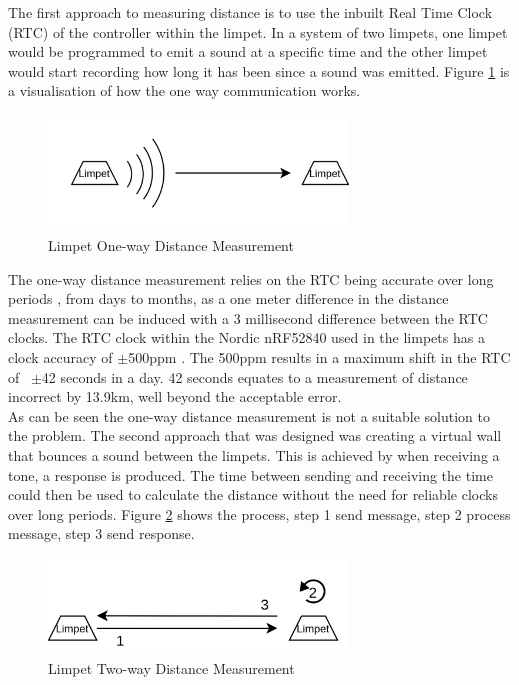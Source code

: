 The first approach to measuring distance is to use the inbuilt Real Time Clock (RTC) of the controller within the limpet. In a system of two limpets, one limpet would be programmed to emit a sound at a specific time and the other limpet would start recording how long it has been since a sound was emitted. Figure \ref{fig:limpetOneway} is a visualisation of how the one way communication works.\\

\begin{figure}[H]
	\centering
	\noindent\includegraphics[width=0.71\textwidth]{images/limpetOneway}
	\caption{Limpet One-way Distance Measurement}
	\label{fig:limpetOneway}
\end{figure}

The one-way distance measurement relies on the RTC being accurate over long periods \cite{rtccomp}, from days to months, as a one meter difference in the distance measurement can be induced with a 3 millisecond difference between the RTC clocks. The RTC clock within the Nordic nRF52840 used in the limpets has a clock accuracy of $\pm$500ppm \cite{nrf52840}. The 500ppm results in a maximum shift in the RTC of ~$\pm$42 seconds in a day. 42 seconds equates to a measurement of distance incorrect by 13.9km, well beyond the acceptable error.\\

As can be seen the one-way distance measurement is not a suitable solution to the problem. The second approach that was designed was creating a virtual wall that bounces a sound between the limpets. This is achieved by when receiving a tone, a response is produced. The time between sending and receiving the time could then be used to calculate the distance without the need for reliable clocks over long periods. Figure \ref{fig:limpetTwoway} shows the process, step 1 send message, step 2 process message, step 3 send response.\\

\begin{figure}[H]
	\centering
	\noindent\includegraphics[width=0.71\textwidth]{images/limpetTwoway}
	\caption{Limpet Two-way Distance Measurement}
	\label{fig:limpetTwoway}
\end{figure}


